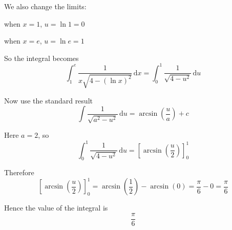 \documentclass[leqno]{article}
\begin{document}
\begin{enumerate}[
  label=\textbf{\arabic*.},
  leftmargin=*,
  topsep=0pt,
  partopsep=0pt,
  parsep=0pt
]
\begin{tcolorbox}[colback=white, colframe=scarlet, title={\textbf{Solution}}, breakable, grow to left by=6mm, grow to right by=10mm]
We also change the limits:

when \(x=1\), \(u=\ln 1=0\)

when \(x=e\), \(u=\ln e=1\)

So the integral becomes
\[
\int_1^{e} \frac{1}{x\sqrt{4-(\ln x)^2}} \,\mathrm{d}x
=
\int_0^{1} \frac{1}{\sqrt{4-u^2}} \,\mathrm{d}u
\]

Now use the standard result
\[
\int \frac{1}{\sqrt{a^2-u^2}} \,\mathrm{d}u
=
\arcsin\!\left(\frac{u}{a}\right)+c
\]

Here \(a=2\), so
\[
\int_0^{1} \frac{1}{\sqrt{4-u^2}} \,\mathrm{d}u
=
\left[\arcsin\!\left(\frac{u}{2}\right)\right]_0^1
\]

Therefore
\[
\left[\arcsin\!\left(\frac{u}{2}\right)\right]_0^1
=
\arcsin\!\left(\frac12\right)-\arcsin(0)
=
\frac{\pi}{6}-0
=
\frac{\pi}{6}
\]

Hence the value of the integral is
\[
\frac{\pi}{6}
\]
\end{tcolorbox}


\end{enumerate}
\end{document}
